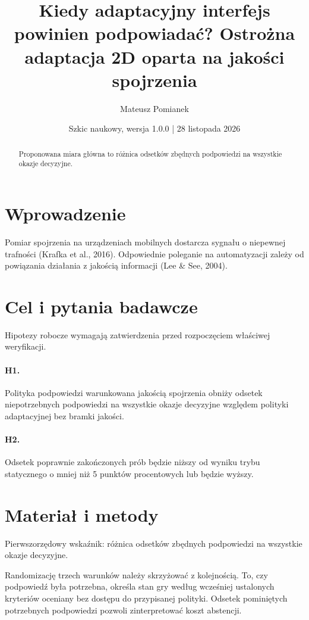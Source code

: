 \documentclass[11pt,a4paper]{article}
\title{Kiedy adaptacyjny interfejs powinien podpowiadać? Ostrożna adaptacja 2D oparta na jakości spojrzenia}
\author{Mateusz Pomianek}
\date{Szkic naukowy, wersja 1.0.0 | 28 listopada 2026}
\begin{document}
\maketitle

\begin{abstract}

Proponowana miara główna to różnica odsetków zbędnych podpowiedzi na wszystkie okazje decyzyjne.

\end{abstract}

\section{Wprowadzenie}

Pomiar spojrzenia na urządzeniach mobilnych dostarcza sygnału o niepewnej trafności (Krafka et al., 2016). Odpowiednie poleganie na automatyzacji zależy od powiązania działania z jakością informacji (Lee \& See, 2004).

\section{Cel i pytania badawcze}

Hipotezy robocze wymagają zatwierdzenia przed rozpoczęciem właściwej weryfikacji.

\paragraph{H1.} Polityka podpowiedzi warunkowana jakością spojrzenia obniży odsetek niepotrzebnych podpowiedzi na wszystkie okazje decyzyjne względem polityki adaptacyjnej bez bramki jakości.

\paragraph{H2.} Odsetek poprawnie zakończonych prób będzie niższy od wyniku trybu statycznego o mniej niż 5 punktów procentowych lub będzie wyższy.

\section{Materiał i metody}

Pierwszorzędowy wskaźnik: różnica odsetków zbędnych podpowiedzi na wszystkie okazje decyzyjne.

Randomizację trzech warunków należy skrzyżować z kolejnością. To, czy podpowiedź była potrzebna, określa stan gry według wcześniej ustalonych kryteriów oceniany bez dostępu do przypisanej polityki. Odsetek pominiętych potrzebnych podpowiedzi pozwoli zinterpretować koszt abstencji.
\end{document}
